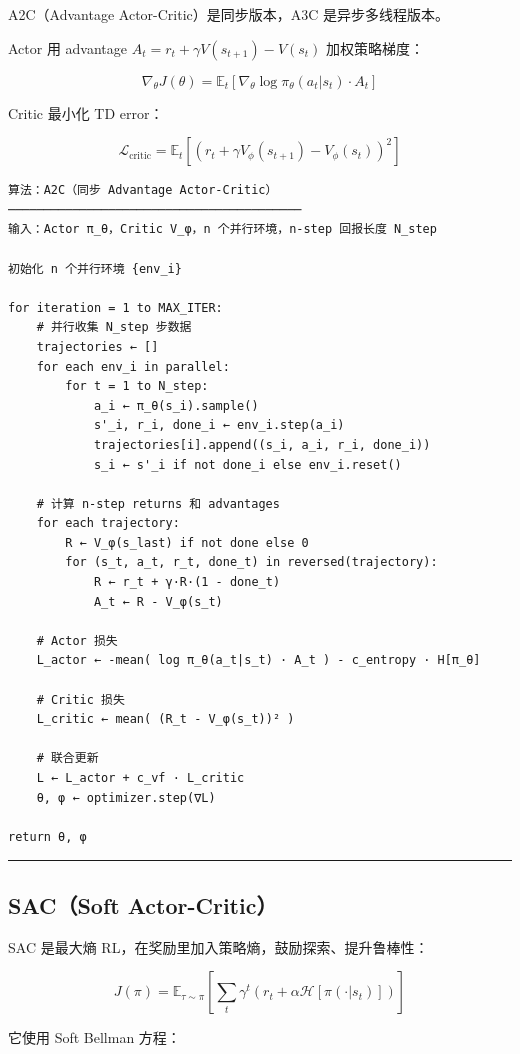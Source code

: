 A2C（Advantage Actor-Critic）是同步版本，A3C 是异步多线程版本。

Actor 用 advantage \(A_t = r_t + \gamma V(s_{t+1}) - V(s_t)\) 加权策略梯度：

\[
\nabla_\theta J(\theta) = \mathbb{E}_t\left[\nabla_\theta \log \pi_\theta(a_t|s_t) \cdot A_t\right]
\]

Critic 最小化 TD error：

\[
\mathcal{L}_\mathrm{critic} = \mathbb{E}_t\left[(r_t + \gamma V_\phi(s_{t+1}) - V_\phi(s_t))^2\right]
\]

\begin{verbatim}
算法：A2C（同步 Advantage Actor-Critic）
─────────────────────────────────────────
输入：Actor π_θ，Critic V_φ，n 个并行环境，n-step 回报长度 N_step

初始化 n 个并行环境 {env_i}

for iteration = 1 to MAX_ITER:
    # 并行收集 N_step 步数据
    trajectories ← []
    for each env_i in parallel:
        for t = 1 to N_step:
            a_i ← π_θ(s_i).sample()
            s'_i, r_i, done_i ← env_i.step(a_i)
            trajectories[i].append((s_i, a_i, r_i, done_i))
            s_i ← s'_i if not done_i else env_i.reset()
    
    # 计算 n-step returns 和 advantages
    for each trajectory:
        R ← V_φ(s_last) if not done else 0
        for (s_t, a_t, r_t, done_t) in reversed(trajectory):
            R ← r_t + γ·R·(1 - done_t)
            A_t ← R - V_φ(s_t)
    
    # Actor 损失
    L_actor ← -mean( log π_θ(a_t|s_t) · A_t ) - c_entropy · H[π_θ]
    
    # Critic 损失
    L_critic ← mean( (R_t - V_φ(s_t))² )
    
    # 联合更新
    L ← L_actor + c_vf · L_critic
    θ, φ ← optimizer.step(∇L)

return θ, φ
\end{verbatim}

\hrule

\subsection{SAC（Soft Actor-Critic）}

SAC 是最大熵 RL，在奖励里加入策略熵，鼓励探索、提升鲁棒性：

\[
J(\pi) = \mathbb{E}_{\tau \sim \pi}\left[\sum_t \gamma^t \left(r_t + \alpha \mathcal{H}[\pi(\cdot|s_t)]\right)\right]
\]

它使用 Soft Bellman 方程：

